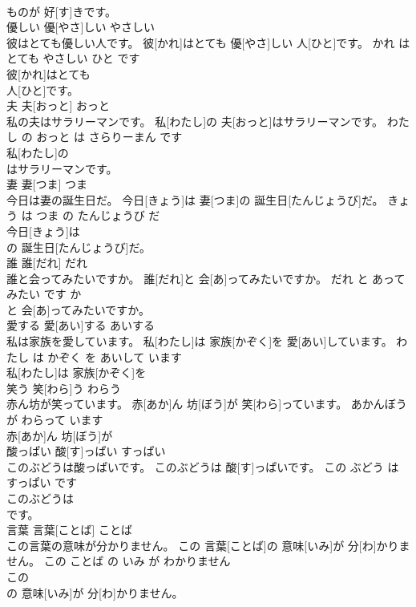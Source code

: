 \documentclass[8pt]{extreport}
\begin{document}
\begin{CJK}{UTF8}{min}
\\	ものが 好[す]きです。		
\\	優しい	優[やさ]しい	やさしい	
\\	彼はとても優しい人です。	彼[かれ]はとても 優[やさ]しい 人[ひと]です。	かれ は とても やさしい ひと です	
\\	彼[かれ]はとても
\\	人[ひと]です。		
\\	夫	夫[おっと]	おっと	
\\	私の夫はサラリーマンです。	私[わたし]の 夫[おっと]はサラリーマンです。	わたし の おっと は さらりーまん です	
\\	私[わたし]の
\\	はサラリーマンです。		
\\	妻	妻[つま]	つま	
\\	今日は妻の誕生日だ。	今日[きょう]は 妻[つま]の 誕生日[たんじょうび]だ。	きょう は つま の たんじょうび だ	
\\	今日[きょう]は
\\	の 誕生日[たんじょうび]だ。		
\\	誰	誰[だれ]	だれ	
\\	誰と会ってみたいですか。	誰[だれ]と 会[あ]ってみたいですか。	だれ と あって みたい です か	
\\	と 会[あ]ってみたいですか。		
\\	愛する	愛[あい]する	あいする	
\\	私は家族を愛しています。	私[わたし]は 家族[かぞく]を 愛[あい]しています。	わたし は かぞく を あいして います	
\\	私[わたし]は 家族[かぞく]を
\\	笑う	笑[わら]う	わらう	
\\	赤ん坊が笑っています。	赤[あか]ん 坊[ぼう]が 笑[わら]っています。	あかんぼう が わらって います	
\\	赤[あか]ん 坊[ぼう]が
\\	酸っぱい	酸[す]っぱい	すっぱい	
\\	このぶどうは酸っぱいです。	このぶどうは 酸[す]っぱいです。	この ぶどう は すっぱい です	
\\	このぶどうは
\\	です。		
\\	言葉	言葉[ことば]	ことば	
\\	この言葉の意味が分かりません。	この 言葉[ことば]の 意味[いみ]が 分[わ]かりません。	この ことば の いみ が わかりません	
\\	この
\\	の 意味[いみ]が 分[わ]かりません。		

\end{CJK}
\end{document}
